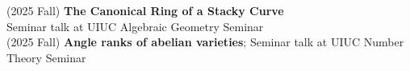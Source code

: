 \documentclass[margin,line]{res}
\begin{document}
\begin{resume}
(2025 Fall) \textbf{The Canonical Ring of a Stacky Curve}\\
Seminar talk at UIUC Algebraic Geometry Seminar
\vspace{.05cm}\\    
(2025 Fall) \textbf{Angle ranks of abelian varieties};
Seminar talk at UIUC Number Theory Seminar
\vspace{.05cm}\\

\end{resume}
\end{document}
